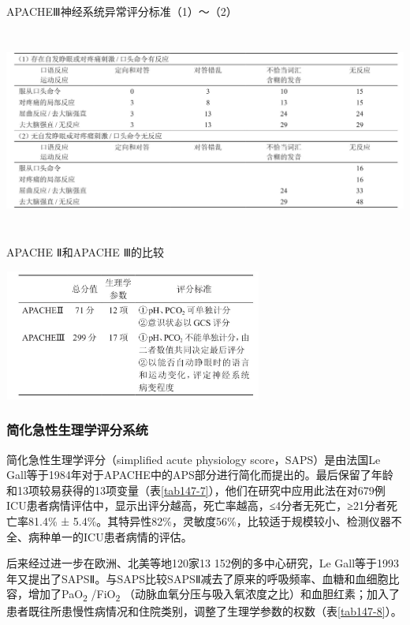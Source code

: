 \begin{table}[htbp]
\centering
\caption{APACHEⅢ神经系统异常评分标准（1）～（2）}
\label{tab147-5}
\includegraphics[width=6.6875in,height=2.63542in]{./images/Image00540.jpg}
\end{table}

\begin{table}[htbp]
\centering
\caption{APACHE Ⅱ和APACHE Ⅲ的比较}
\label{tab147-6}
\includegraphics[width=3.34375in,height=1.6875in]{./images/Image00541.jpg}
\end{table}

\subsubsection{简化急性生理学评分系统}

简化急性生理学评分（simplified acute physiology score，SAPS）是由法国Le
Gall等于1984年对于APACHE中的APS部分进行简化而提出的。最后保留了年龄和13项较易获得的13项变量（表\ref{tab147-7}），他们在研究中应用此法在对679例ICU患者病情评估中，显示出评分越高，死亡率越高，≤4分者无死亡，≥21分者死亡率81.4\%
±
5.4\%。其特异性82\%，灵敏度56\%，比较适于规模较小、检测仪器不全、病种单一的ICU患者病情的评估。

后来经过进一步在欧洲、北美等地120家13 152例的多中心研究，Le
Gall等于1993年又提出了SAPSⅡ。与SAPS比较SAPSⅡ减去了原来的呼吸频率、血糖和血细胞比容，增加了PaO\textsubscript{2}
/FiO\textsubscript{2}
（动脉血氧分压与吸入氧浓度之比）和血胆红素；加入了患者既往所患慢性病情况和住院类别，调整了生理学参数的权数（表\ref{tab147-8}）。


